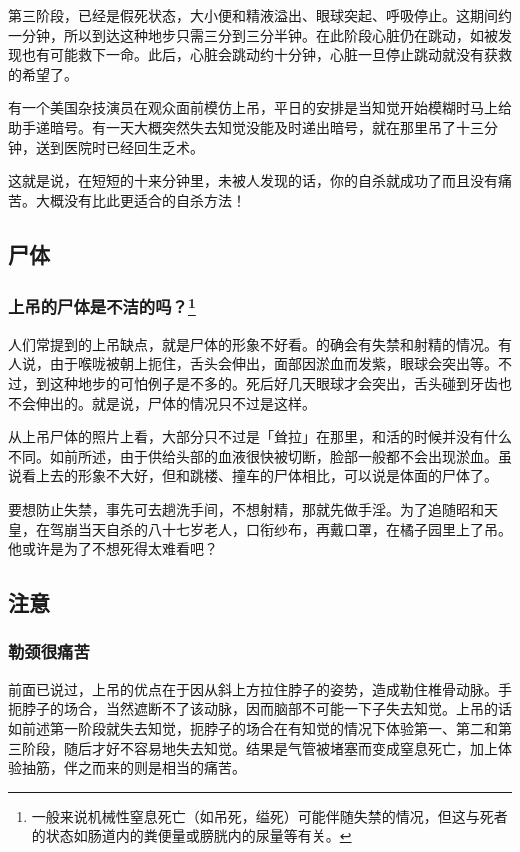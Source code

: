 \documentclass[UTF8]{ctexart}
\begin{document}
第三阶段，已经是假死状态，大小便和精液溢出、眼球突起、呼吸停止。这期间约一分钟，所以到达这种地步只需三分到三分半钟。在此阶段心脏仍在跳动，如被发现也有可能救下一命。此后，心脏会跳动约十分钟，心脏一旦停止跳动就没有获救的希望了。

有一个美国杂技演员在观众面前模仿上吊，平日的安排是当知觉开始模糊时马上给助手递暗号。有一天大概突然失去知觉没能及时递出暗号，就在那里吊了十三分钟，送到医院时已经回生乏术。

这就是说，在短短的十来分钟里，未被人发现的话，你的自杀就成功了而且没有痛苦。大概没有比此更适合的自杀方法！


\subsection{尸体}

\subsubsection*{上吊的尸体是不洁的吗？\footnote{一般来说机械性窒息死亡（如吊死，缢死）可能伴随失禁的情况，但这与死者的状态如肠道内的粪便量或膀胱内的尿量等有关。}}
 
人们常提到的上吊缺点，就是尸体的形象不好看。的确会有失禁和射精的情况。有人说，由于喉咙被朝上扼住，舌头会伸出，面部因淤血而发紫，眼球会突出等。不过，到这种地步的可怕例子是不多的。死后好几天眼球才会突出，舌头碰到牙齿也不会伸出的。就是说，尸体的情况只不过是这样。

从上吊尸体的照片上看，大部分只不过是「耸拉」在那里，和活的时候并没有什么不同。如前所述，由于供给头部的血液很快被切断，脸部一般都不会出现淤血。虽说看上去的形象不大好，但和跳楼、撞车的尸体相比，可以说是体面的尸体了。

要想防止失禁，事先可去趟洗手间，不想射精，那就先做手淫。为了追随昭和天皇，在驾崩当天自杀的八十七岁老人，口衔纱布，再戴口罩，在橘子园里上了吊。他或许是为了不想死得太难看吧？

\subsection{注意}

\subsubsection*{勒颈很痛苦}

前面已说过，上吊的优点在于因从斜上方拉住脖子的姿势，造成勒住椎骨动脉。手扼脖子的场合，当然遮断不了该动脉，因而脑部不可能一下子失去知觉。上吊的话如前述第一阶段就失去知觉，扼脖子的场合在有知觉的情况下体验第一、第二和第三阶段，随后才好不容易地失去知觉。结果是气管被堵塞而变成窒息死亡，加上体验抽筋，伴之而来的则是相当的痛苦。
\end{document}
